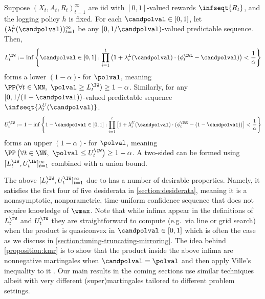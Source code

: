 \begin{proposition}\label{proposition:kmr}
  Suppose $(X_t, A_t, R_t)_{t=1}^\infty$ are iid with $[0, 1]$-valued rewards $\infseqt{R_t}$, and the logging policy $h$ is fixed. For each $\candpolval \in [0, 1]$, let   $(\lambda_t^L(\candpolval))_{t=1}^\infty$ be any $[0, 1/\candpolval)$-valued predictable sequence.
  Then,
  \begin{equation}\label{eq:kmr-cs}
    L_t^\IW := \inf\left \{ \candpolval \in [0, 1] : \prod_{i=1}^t \left ( 1 + \lambda_i^L(\candpolval) \cdot (\phi_t^\IWL - \candpolval) \right ) < \frac{1}{\alpha} \right \}
  \end{equation}
  forms a lower $(1-\alpha)$-\cs{} for $\polval$, meaning $\PP(\forall t \in \NN,\ \polval \geq L_t^\IW) \geq 1-\alpha$. Similarly, for any $[0, 1/(1-\candpolval))$-valued predictable sequence $\infseqt{\lambda_t^U(\candpolval)}$.
  \begin{equation}
    U_t^\IW := 1 - \inf \left \{ 1-\candpolval \in [0, 1] : \prod_{i=1}^t \left [ 1 + \lambda_i^U(\candpolval) \cdot (\phi_t^\IWU - (1-\candpolval)) \right ] < \frac{1}{\alpha} \right \}
  \end{equation}
  forms an upper $(1-\alpha)$-\cs{} for $\polval$, meaning $\PP \left ( \forall t \in \NN,\ \polval \leq U_t^\IW \right ) \geq 1-\alpha$. A two-sided \cs{} can be formed using $[L_t^\IW, U_t^\IW]_{t=1}^\infty$ combined with a union bound.
\end{proposition}
The above \cs{} $[L_t^\IW, U_t^\IW]_{t=1}^\infty$ due to \citet{karampatziakis2021off} has a number of desirable properties. Namely, it satisfies the first four of five desiderata in \cref{section:desiderata}, meaning it is a nonasymptotic, nonparametric, time-uniform confidence sequence that does not require knowledge of $\wmax$. Note that while infima appear in the definitions of $L_t^\IW$ and $U_t^\IW$ they are straightforward to compute (e.g.~via line or grid search) when the product is quasiconvex in $\candpolval \in [0, 1]$ which is often the case as we discuss in \cref{section:tuning-truncating-mirroring}.
The idea behind \cref{proposition:kmr} is to show that the product inside the above infima are nonnegative martingales when $\candpolval = \polval$ and then apply Ville's inequality to it \citep{ville1939etude}. Our main results in the coming sections use similar techniques albeit with very different (super)martingales tailored to different problem settings.


